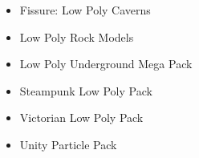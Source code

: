



\begin{itemize}  
    \item Fissure: Low Poly Caverns \cite{noauthor_fissure_nodate}
    \item Low Poly Rock Models \cite{noauthor_low_nodate}
    \item Low Poly Underground Mega Pack \cite{noauthor_low_nodate}
    \item Steampunk Low Poly Pack \cite{noauthor_steampunk_lp}
    \item Victorian Low Poly Pack \cite{noauthor_victorian_nodate}
    \item Unity Particle Pack \cite{noauthor_unity_nodate}
\end{itemize}


